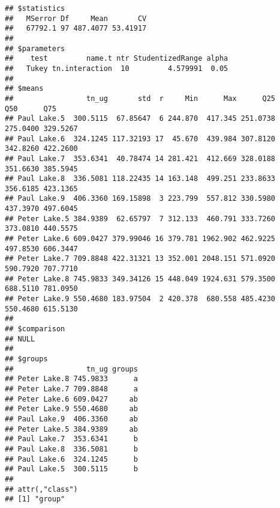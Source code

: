 \documentclass[
]{article}
\newenvironment{Shaded}{\begin{snugshade}}{\end{snugshade}}
\newcommand{\CommentTok}[1]{\textcolor[rgb]{0.56,0.35,0.01}{\textit{#1}}}
\newcommand{\DataTypeTok}[1]{\textcolor[rgb]{0.13,0.29,0.53}{#1}}
\newcommand{\FloatTok}[1]{\textcolor[rgb]{0.00,0.00,0.81}{#1}}
\newcommand{\KeywordTok}[1]{\textcolor[rgb]{0.13,0.29,0.53}{\textbf{#1}}}
\newcommand{\NormalTok}[1]{#1}
\newcommand{\OperatorTok}[1]{\textcolor[rgb]{0.81,0.36,0.00}{\textbf{#1}}}
\newcommand{\OtherTok}[1]{\textcolor[rgb]{0.56,0.35,0.01}{#1}}
\newcommand{\StringTok}[1]{\textcolor[rgb]{0.31,0.60,0.02}{#1}}
\begin{document}
\begin{Shaded}
\end{Shaded}

\begin{verbatim}
## $statistics
##   MSerror Df     Mean       CV
##   67792.1 97 487.4077 53.41917
## 
## $parameters
##    test         name.t ntr StudentizedRange alpha
##   Tukey tn.interaction  10         4.579991  0.05
## 
## $means
##                 tn_ug       std  r     Min      Max      Q25      Q50      Q75
## Paul Lake.5  300.5115  67.85647  6 244.870  417.345 251.0738 275.0400 329.5267
## Paul Lake.6  324.1245 117.32193 17  45.670  439.984 307.8120 342.8260 422.2600
## Paul Lake.7  353.6341  40.78474 14 281.421  412.669 328.0188 351.6630 385.5945
## Paul Lake.8  336.5081 118.22435 14 163.148  499.251 233.8633 356.6185 423.1365
## Paul Lake.9  406.3360 169.15898  3 223.799  557.812 330.5980 437.3970 497.6045
## Peter Lake.5 384.9389  62.65797  7 312.133  460.791 333.7260 373.0810 440.5575
## Peter Lake.6 609.0427 379.99046 16 379.781 1962.902 462.9225 497.8530 606.3447
## Peter Lake.7 709.8848 422.31321 13 352.001 2048.151 571.0920 590.7920 707.7710
## Peter Lake.8 745.9833 349.34126 15 448.049 1924.631 579.3500 688.5110 781.0950
## Peter Lake.9 550.4680 183.97504  2 420.378  680.558 485.4230 550.4680 615.5130
## 
## $comparison
## NULL
## 
## $groups
##                 tn_ug groups
## Peter Lake.8 745.9833      a
## Peter Lake.7 709.8848      a
## Peter Lake.6 609.0427     ab
## Peter Lake.9 550.4680     ab
## Paul Lake.9  406.3360     ab
## Peter Lake.5 384.9389     ab
## Paul Lake.7  353.6341      b
## Paul Lake.8  336.5081      b
## Paul Lake.6  324.1245      b
## Paul Lake.5  300.5115      b
## 
## attr(,"class")
## [1] "group"
\end{verbatim}
\end{document}

